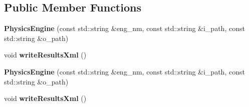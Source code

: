 \subsection*{Public Member Functions}
\begin{DoxyCompactItemize}
\item 
{\bfseries Physics\+Engine} (const std\+::string \&eng\+\_\+nm, const std\+::string \&i\+\_\+path, const std\+::string \&o\+\_\+path)\hypertarget{classphys_1_1PhysicsEngine_a8ed0e29400b57ba747b2eccf50b41729}{}\label{classphys_1_1PhysicsEngine_a8ed0e29400b57ba747b2eccf50b41729}

\item 
void {\bfseries write\+Results\+Xml} ()\hypertarget{classphys_1_1PhysicsEngine_ab7e79faceb2a84e65045b3b13b39aace}{}\label{classphys_1_1PhysicsEngine_ab7e79faceb2a84e65045b3b13b39aace}

\item 
{\bfseries Physics\+Engine} (const std\+::string \&eng\+\_\+nm, const std\+::string \&i\+\_\+path, const std\+::string \&o\+\_\+path)\hypertarget{classphys_1_1PhysicsEngine_ac8d64e8ac3e5db3f5d2d519d5f126d11}{}\label{classphys_1_1PhysicsEngine_ac8d64e8ac3e5db3f5d2d519d5f126d11}

\item 
void {\bfseries write\+Results\+Xml} ()\hypertarget{classphys_1_1PhysicsEngine_a2ae5fab4506eacdd5f7daf702acdcff1}{}\label{classphys_1_1PhysicsEngine_a2ae5fab4506eacdd5f7daf702acdcff1}

\end{DoxyCompactItemize}
